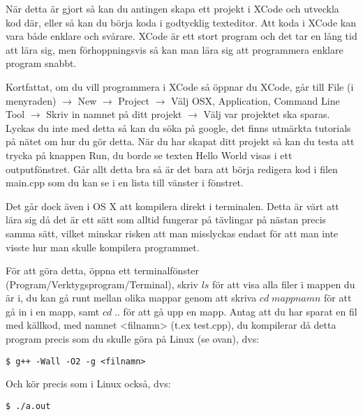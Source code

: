 När detta är gjort så kan du antingen skapa ett projekt i XCode och utveckla kod där, eller så kan du börja koda i godtycklig texteditor.
Att koda i XCode kan vara både enklare och svårare. XCode är ett stort program och det tar en lång tid att lära sig, men förhoppningsvis så kan man lära sig att programmera enklare program snabbt.

Kortfattat, om du vill programmera i XCode så öppnar du XCode, går till File (i menyraden) $\rightarrow$ New $\rightarrow$ Project $\rightarrow$ Välj OSX, Application, Command Line Tool $\rightarrow$ Skriv in namnet på ditt projekt $\rightarrow$ Välj var projektet ska sparas. Lyckas du inte med detta så kan du söka på google, det finns utmärkta tutorials på nätet om hur du gör detta. När du har skapat ditt projekt så kan du testa att trycka på knappen Run, du borde se texten Hello World visas i ett outputfönstret. Går allt detta bra så är det bara att börja redigera kod i filen main.cpp som du kan se i en lista till vänster i fönstret.

Det går dock även i OS X att kompilera direkt i terminalen. Detta är värt att lära sig då det är ett sätt som alltid fungerar på tävlingar på nästan precis samma sätt, vilket minskar risken att man misslyckas endast för att man inte visste hur man skulle kompilera programmet.

För att göra detta, öppna ett terminalfönster (Program/Verktygsprogram/Terminal), skriv $ls$ för att visa alla filer i mappen du är i, du kan gå runt mellan olika mappar genom att skriva $cd \;mappnamn$ för att gå in i en mapp, samt $cd \;..$ för att gå upp en mapp.
Antag att du har sparat en fil med källkod, med namnet <filnamn> (t.ex test.cpp), du kompilerar då detta program precis som du skulle göra på Linux (se ovan), dvs:

\texttt{\$ g++ -Wall -O2 -g <filnamn>}

Och kör precis som i Linux också, dvs:

\texttt{\$ ./a.out}